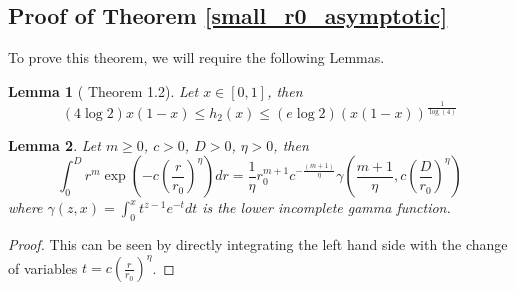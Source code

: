 \documentclass{article}
\newtheorem{lemma}{Lemma}
\begin{document}
\subsection{Proof of Theorem \ref{small_r0_asymptotic}}
\label{small_r0_proof}
    To prove this theorem, we will require the following Lemmas.
    \begin{lemma}[\cite{Topsøe2001} Theorem 1.2]
        \label{thm:entroyp_sandwich}
        Let $x \in [0,1]$, then
        \begin{equation}
            (4\log 2) x(1-x) \leq h_2(x) \leq (e \log 2) (x(1-x))^{\frac{1}{\log(4)}}
        \end{equation}
    \end{lemma}
    \begin{lemma}
        \label{thm:int_0_D}
        Let $m \geq 0$, $c > 0$, $D > 0$, $\eta > 0$, then
        \begin{equation}
            \int_0^D r^m \exp\left(-c\left(\frac{r}{r_0}\right)^{\eta}\right) dr = \frac{1}{\eta}r_0^{m+1} c^{-\frac{(m+1)}{\eta}} \gamma\left(\frac{m+1}{\eta}, c\left(\frac{D}{r_0}\right)^\eta\right)
        \end{equation}
        where $\gamma(z, x) = \int_0^x t^{z-1}e^{-t}dt$ is the lower incomplete gamma function.
    \end{lemma}
    \begin{proof}
        This can be seen by directly integrating the left hand side with the change of variables $t = c\left(\frac{r}{r_0}\right)^{\eta}$.
    \end{proof}
\end{document}
